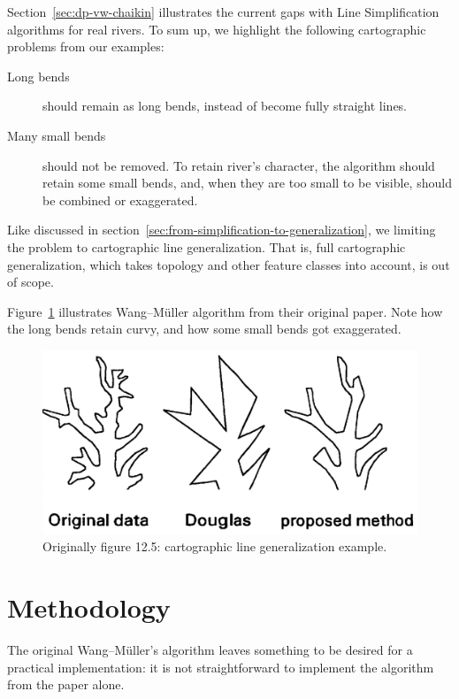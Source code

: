\documentclass[a4paper]{article}
\newcommand{\WM}{Wang--M{\"u}ller}
\begin{document}
Section~\ref{sec:dp-vw-chaikin} illustrates the current gaps with Line
Simplification algorithms for real rivers. To sum up, we highlight the
following cartographic problems from our examples:

\begin{description}

    \item[Long bends] should remain as long bends, instead of become fully
        straight lines.

    \item[Many small bends] should not be removed. To retain river's character,
        the algorithm should retain some small bends, and, when they are too
        small to be visible, should be combined or exaggerated.

\end{description}

Like discussed in section~\ref{sec:from-simplification-to-generalization}, we
limiting the problem to cartographic line generalization. That is, full
cartographic generalization, which takes topology and other feature classes
into account, is out of scope.

Figure~\ref{fig:wang125} illustrates {\WM} algorithm from their original
paper. Note how the long bends retain curvy, and how some small bends got
exaggerated.

\begin{figure}[ht]
    \centering
    \includegraphics[width=.8\textwidth]{wang125}

    \caption{Originally figure 12.5: cartographic line generalization example.}

    \label{fig:wang125}
\end{figure}

\section{Methodology}
\label{sec:methodology}

The original {\WM}'s algorithm \cite{wang1998line} leaves something to be
desired for a practical implementation: it is not straightforward to implement
the algorithm from the paper alone.
\end{document}
